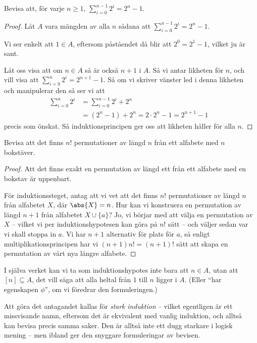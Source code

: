 \documentclass[nobib]{tufte-handout}
\begin{document}
\begin{example}
  Bevisa att, för varje $n\geq 1$, $\sum_{i=0}^{n-1} 2^i = 2^n - 1$.

  \begin{proof}
    Låt $A$ vara mängden av alla $n$ sådana att $\sum_{i=0}^{n-1} 2^i = 2^n - 1$.

    Vi ser enkelt att $1 \in A$, eftersom påståendet då blir att $2^0 = 2^1 - 1$, vilket ju är sant.

    Låt oss visa att om $n \in A$ så är också $n+1$ i $A$. Så vi antar likheten för $n$, och vill visa att $\sum_{i=0}^{n} 2^i = 2^{n+1} - 1$. Så om vi skriver vänster led i denna likheten och manipulerar den så ser vi att
    \begin{align*}
      \sum_{i=0}^{n} 2^i &= \sum_{i=0}^{n-1} 2^i + 2^n\\
      &= \left(2^n - 1\right) + 2^n = 2\cdot 2^n - 1 = 2^{n+1} - 1
    \end{align*}
    precis som önskat. Så induktionsprincipen ger oss att likheten håller för alla $n$.
  \end{proof}
\end{example}

\begin{example}
  Bevisa att det finns $n!$ permutationer av längd $n$ från ett alfabete med $n$ bokstäver.
  
  \begin{proof}
    Att det finns exakt en permutation av längd ett från ett alfabete med en bokstav är uppenbart.

    För induktionssteget, antag att vi vet att det finns $n!$ permutationer av längd $n$ från alfabetet $X$, där $\abs{X} = n$. Hur kan vi konstruera en permutation av längd $n+1$ från alfabetet $X\cup\{a\}$? Jo, vi börjar med att välja en permutation av $X$ -- vilket vi per induktionshypotesen kan göra på $n!$ sätt -- och väljer sedan var vi skall stoppa in $a$. Vi har $n+1$ alternativ för plats för $a$, så enligt multiplikationsprincipen har vi $(n+1)n! = (n+1)!$ sätt att skapa en permutation av vårt nya längre alfabete.
  \end{proof}
\end{example}

\begin{remark}
  I själva verket kan vi ta som induktionshypotes inte bara att $n \in A$, utan att $[n] \subseteq A$, det vill säga att alla heltal från $1$ till $n$ ligger i $A$. (Eller ``har egenskapen $\phi$'', om vi föredrar den formuleringen.) 
  
  Att göra det antagandet kallas för \emph{stark induktion} -- vilket egentligen är ett missvisande namn, eftersom det är ekvivalent med vanlig induktion, och alltså kan bevisa precis samma saker. Den är alltså inte ett dugg starkare i logisk mening -- men ibland ger den snyggare formuleringar av bevisen.
\end{remark}
\end{document}
